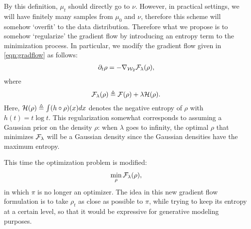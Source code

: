 By this definition, $\mu_t$ should directly go to $\nu$. However, in practical settings, we will have finitely many samples from $\mu_0$ and $\nu$, therefore this scheme will somehow `overfit' to the data distribution. Therefore what we propose is to somehow `regularize' the gradient flow by introducing an entropy term to the minimization process. In particular, we modify the gradient flow given in \eqref{eqn:gradflow} as follows:
\begin{align}
\partial_t \rho = - \nabla_{{\cal W}_2} {\cal F}_\lambda(\rho),
\end{align}
where
\begin{align}
{\cal F}_\lambda(\rho) \triangleq {\cal F}(\rho) + \lambda {\cal H}(\rho).
\end{align}
Here, ${\cal H}(\rho) \triangleq \int (h \circ \rho) (x) dx $ denotes the negative entropy of $\rho$ with $h(t) = t \log t$. This regularization somewhat corresponds to assuming a Gaussian prior on the density $\rho$: when $\lambda$ goes to infinity, the optimal $\rho$ that minimizes ${\cal F}_\lambda$ will be a Gaussian density since the Gaussian densities have the maximum entropy.


This time the optimization problem is modified:
\begin{align}
\min_\rho {\cal F}_\lambda(\rho),
\end{align}
in which $\pi$ is no longer an optimizer. The idea in this new gradient flow formulation is to take $\rho_t$ as close as possible to $\pi$, while trying to keep its entropy at a certain level, so that it would be expressive for generative modeling purposes.





